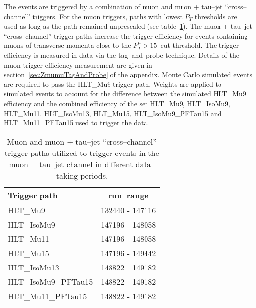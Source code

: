 The events are triggered by a combination of muon and muon + tau--jet
``cross--channel'' triggers. For the muon triggers, paths with lowest $P_{T}$
thresholds are used as long as the path remained unprescaled (see
table~\ref{tab:AHtoMuTauTriggers}). 
The muon + tau--jet ``cross--channel'' trigger paths increase the trigger efficiency for
events containing muons of transverse momenta close to the
$P_{T}^{\mu} > 15$~\GeV cut threshold.
The trigger efficiency is measured in data via the tag--and--probe
technique. Details of the muon trigger efficiency measurement are
given in section~\ref{sec:ZmumuTagAndProbe} of the appendix.
Monte Carlo simulated events are required to pass the
HLT\_Mu9 trigger path. Weights are applied to simulated events to account for the
difference between the simulated HLT\_Mu9 efficiency and the combined
efficiency of the set HLT\_Mu9, HLT\_IsoMu9, HLT\_Mu11, HLT\_IsoMu13,
HLT\_Mu15, HLT\_IsoMu9\_PFTau15 and HLT\_Mu11\_PFTau15 used to trigger
the data.

\begin{table}[t]
\begin{center}

\begin{tabular}{|l|c|}
\hline
Trigger path & run--range \\
\hline
HLT\_Mu9             & 132440 - 147116 \\
HLT\_IsoMu9          & 147196 - 148058 \\
HLT\_Mu11            & 147196 - 148058 \\
HLT\_Mu15            & 147196 - 149442 \\
HLT\_IsoMu13         & 148822 - 149182 \\
HLT\_IsoMu9\_PFTau15 & 148822 - 149182 \\
HLT\_Mu11\_PFTau15   & 148822 - 149182 \\
\hline
\end{tabular}
\end{center}
\begin{center}
\caption{\captiontext Muon and muon + tau--jet ``cross--channel''
  trigger paths utilized to trigger events in the muon + tau--jet channel in different data--taking periods.}
\label{tab:AHtoMuTauTriggers}
\end{center}
\end{table}

\ifx\master\undefined\fi
